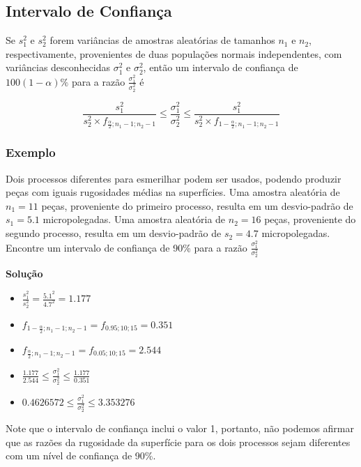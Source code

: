 \documentclass[
]{book}
\providecommand{\tightlist}{%
  \setlength{\itemsep}{0pt}\setlength{\parskip}{0pt}}
\begin{document}
\hypertarget{intervalo-de-confianuxe7a-2}{%
\subsection{Intervalo de Confiança}\label{intervalo-de-confianuxe7a-2}}

Se \(s_1^2\) e \(s_2^2\) forem variâncias de amostras aleatórias de tamanhos \(n_1\) e \(n_2\), respectivamente, provenientes de duas populações normais independentes, com variâncias desconhecidas \(\sigma_1^2\) e \(\sigma_2^2\), então um intervalo de confiança de \(100(1-\alpha)\%\) para a razão \(\frac{\sigma^2_1}{\sigma^2_2}\) é

\[\frac{s_1^2}{s_2^2\times f_{\frac{\alpha}{2};n_1-1;n_2-1}}\leq \frac{\sigma^2_1}{\sigma^2_2} \leq \frac{s_1^2}{s_2^2\times f_{1-\frac{\alpha}{2};n_1-1;n_2-1}}\]

\hypertarget{exemplo-16}{%
\subsubsection{Exemplo}\label{exemplo-16}}

Dois processos diferentes para esmerilhar podem ser usados, podendo produzir peças com iguais rugosidades médias na superfícies. Uma amostra aleatória de \(n_1=11\) peças, proveniente do primeiro processo, resulta em um desvio-padrão de \(s_1=5.1\) micropolegadas. Uma amostra aleatória de \(n_2=16\) peças, proveniente do segundo processo, resulta em um desvio-padrão de \(s_2=4.7\) micropolegadas. Encontre um intervalo de confiança de 90\% para a razão \(\frac{\sigma^2_1}{\sigma^2_2}\)

\textbf{Solução}

\begin{itemize}
\tightlist
\item
  \(\frac{s_1^2}{s_2^2}=\frac{5.1^2}{4.7^2}=1.177\)
\item
  \(f_{1-\frac{\alpha}{2};n_1-1;n_2-1}=f_{0.95;10;15}=0.351\)
\item
  \(f_{\frac{\alpha}{2};n_1-1;n_2-1}=f_{0.05;10;15}=2.544\)
\item
  \(\frac{1.177}{2.544} \leq \frac{\sigma^2_1}{\sigma^2_2} \leq \frac{1.177}{0.351}\)
\item
  \(0.4626572 \leq \frac{\sigma^2_1}{\sigma^2_2} \leq 3.353276\)
\end{itemize}

Note que o intervalo de confiança inclui o valor 1, portanto, não podemos afirmar que as razões da rugosidade da superfície para os dois processos sejam diferentes com um nível de confiança de 90\%.
\end{document}
